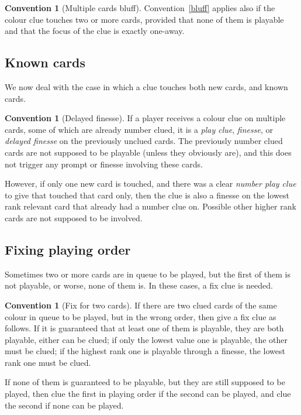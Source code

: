 \documentclass[a4paper]{article}
\theoremstyle{plain}
\theoremstyle{definition}
\newtheorem{convention}[theorem]{Convention}
\begin{document}
\begin{convention}[Multiple cards bluff]
	Convention~\ref{bluff} applies also if the colour clue touches two or more cards, provided that none of them is playable and that the focus of the clue is exactly one-away.
\end{convention}

\subsection{Known cards}

We now deal with the case in which a clue touches both new cards, and known cards.

\begin{convention}[Delayed finesse]
If a player receives a colour clue on multiple cards, some of which are already number clued, it is a \emph{play clue}, \emph{finesse}, or \emph{delayed finesse} on the previously unclued cards. The previously number clued cards are not supposed to be playable (unless they obviously are), and this does not trigger any prompt or finesse involving these cards.

However, if only one new card is touched, and there was a clear \emph{number play clue} to give that touched that card only, then the clue is also a finesse on the lowest rank relevant card that already had a number clue on. Possible other higher rank cards are not supposed to be involved.
\end{convention}

\subsection{Fixing playing order}

Sometimes two or more cards are in queue to be played, but the first of them is not playable, or worse, none of them is. In these cases, a fix clue is needed.

\begin{convention}[Fix for two cards]	
	If there are two clued cards of the same colour in queue to be played, but in the wrong order, then give a fix clue as follows. If it is guaranteed that at least one of them is playable, they are both playable, either can be clued; if only the lowest value one is playable, the other must be clued; if the highest rank one is playable through a finesse, the lowest rank one must be clued.
	
	If none of them is guaranteed to be playable, but they are still supposed to be played, then clue the first in playing order if the second can be played, and clue the second if none can be played.
\end{convention}
	
\end{document}
